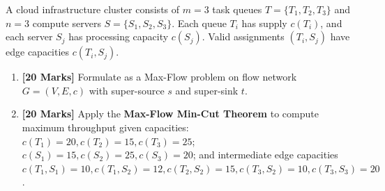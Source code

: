 \documentclass[11pt,a4paper]{article}
\begin{document}
\newpage


\begin{tcolorbox}[problembox, title={\faLayerGroup~~Problem 3: Network Flow \& Workload Allocation \hfill \normalfont\sffamily\small\textbf{[40 Marks]}}]
A cloud infrastructure cluster consists of $m=3$ task queues $T = \{T_1, T_2, T_3\}$ and $n=3$ compute servers $S = \{S_1, S_2, S_3\}$. 
Each queue $T_i$ has supply $c(T_i)$, and each server $S_j$ has processing capacity $c(S_j)$. Valid assignments $(T_i, S_j)$ have edge capacities $c(T_i, S_j)$.
\begin{enumerate}[label=\alph*\lbrack\rbrack, leftmargin=1.8em, itemsep=1pt]
    \item \textbf{[20 Marks]} Formulate as a Max-Flow problem on flow network $G = (V, E, c)$ with super-source $s$ and super-sink $t$.
    \item \textbf{[20 Marks]} Apply the \textbf{Max-Flow Min-Cut Theorem} to compute maximum throughput given capacities:
    $c(T_1)=20, c(T_2)=15, c(T_3)=25$; $c(S_1)=15, c(S_2)=25, c(S_3)=20$; and intermediate edge capacities $c(T_1, S_1)=10, c(T_1, S_2)=12, c(T_2, S_2)=15, c(T_3, S_2)=10, c(T_3, S_3)=20$.
\end{enumerate}
\end{tcolorbox}

\vspace{2pt}
\end{document}
